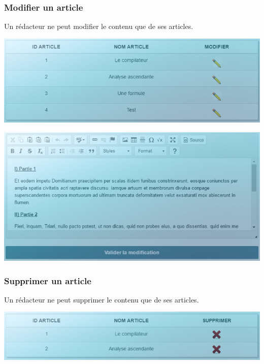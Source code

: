 \documentclass[hidelinks, 12pt,a4paper]{article}
\begin{document}
\subsubsection{Modifier un article}
Un rédacteur ne peut modifier le contenu que de ses articles.\\

\begin{center}
\includegraphics[width=16cm]{images/modifart.png}\\
\end{center}

\begin{center}
\includegraphics[width=16cm]{images/modifart2.png}\\
\end{center}


\subsubsection{Supprimer un article}
Un rédacteur ne peut supprimer le contenu que de ses articles.\\
\begin{center}
\includegraphics[width=16cm]{images/suppart.png}\\
\end{center}
\end{document}
